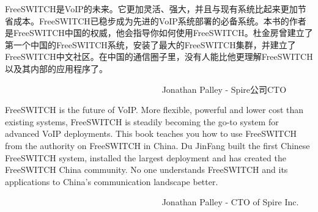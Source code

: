 \documentclass[$if(fontsize)$$fontsize$,$endif$$if(lang)$$lang$,$endif$CJKutf8,twoside,openright]{$documentclass$}
\begin{document}
FreeSWITCH是VoIP的未来。它更加灵活、强大，并且与现有系统比起来更加节省成本。FreeSWITCH已稳步成为先进的VoIP系统部署的必备系统。本书的作者是FreeSWITCH中国的权威，他会指导你如何使用FreeSWITCH。杜金房曾建立了第一个中国的FreeSWITCH系统，安装了最大的FreeSWITCH集群，并建立了FreeSWITCH中文社区。在中国的通信圈子里，没有人能比他更理解FreeSWITCH以及其内部的应用程序了。

　　　　　　　　　　　　　　　　　　 Jonathan Palley - Spire公司CTO

FreeSWITCH is the future of VoIP. More flexible, powerful and lower cost than existing systems, FreeSWITCH is steadily becoming the go-to system for advanced VoIP deployments.  This book teaches you how to use FreeSWITCH from the authority on FreeSWITCH in China.  Du JinFang built the first Chinese FreeSWITCH system, installed the largest deployment and has created the FreeSWITCH China community.  No one understands FreeSWITCH and its applications to China's communication landscape better.

　　　　　　　　　　　　　　　　　　 Jonathan Palley - CTO of Spire Inc.


\newpage

\end{document}

